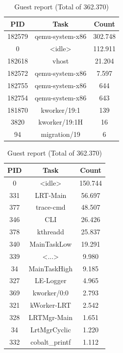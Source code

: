 \documentclass[MMR,Master,english]{twbook}
\begin{document}
\begin{table}[h!]
	\centering
	\begin{minipage}{.5\textwidth}
	\centering
	\caption{Host report CPU19 (Total of 445.908)}
	\label{tab:results_host_report}
	\begin{tabular}{|c|c|c|}
	\hline
	PID & Task & Count \\ \hline
	182579 & qemu-system-x86 & 302.748 \\ \hline
	0 & \textless{}idle\textgreater{} & 112.911 \\ \hline
	182618 & vhost & 21.204 \\ \hline
	182572 & qemu-system-x86 & 7.597 \\ \hline
	182755 & qemu-system-x86 & 644 \\ \hline
	182754 & qemu-system-x86 & 643 \\ \hline
	181870 & kworker/19:1 & 139 \\ \hline
	3820 & kworker/19:1H & 16 \\ \hline
	94 & migration/19 & 6 \\ \hline
	\end{tabular}
	\end{minipage}%
	\begin{minipage}{.5\textwidth}
	\centering
	\caption{Guest report (Total of 362.370)}
	\label{tab:results_guest_report}
	\begin{tabular}{|c|c|c|}
	\hline
	PID & Task & Count \\ \hline
	0 & \textless{}idle\textgreater{} & 150.744 \\ \hline
	331 & LRT-Main & 56.697 \\ \hline
	377 & trace-cmd & 48.507 \\ \hline
	346 & CLI & 26.426 \\ \hline
	378 & kthreadd & 25.837 \\ \hline
	340 & MainTaskLow & 19.291 \\ \hline
	339 & \textless{}...\textgreater{} & 9.980 \\ \hline
	34 & MainTaskHigh & 9.185 \\ \hline
	327 & LE-Logger & 4.965 \\ \hline
	369 & kworker/0:0 & 2.793 \\ \hline
	321 & kWorker-LRT & 2.542 \\ \hline
	328 & LRTMgr-Main & 1.651 \\ \hline
	34 & LrtMgrCyclic & 1.220 \\ \hline
	332 & cobalt\_printf & 1.112 \\ \hline

\end{tabular}
\end{minipage}
\end{table}
\end{document}
